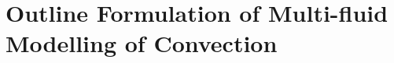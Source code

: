 \documentclass[11pt,a4paper]{article}
\begin{document}




\section{Outline Formulation of Multi-fluid Modelling of Convection}
\label{sec:mf}
\end{document}
